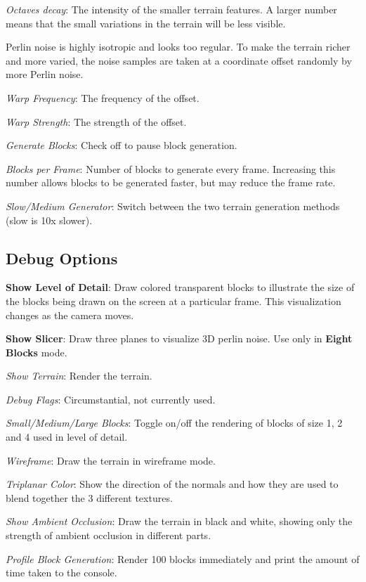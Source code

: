 \documentclass {article}
\begin{document}
\textit{Octaves decay}: The intensity of the smaller terrain features. A larger number means that the small variations in the terrain will be less visible.

Perlin noise is highly isotropic and looks too regular. To make the terrain richer and more varied, the noise samples are taken at a coordinate offset randomly by more Perlin noise.

\textit{Warp Frequency}: The frequency of the offset.

\textit{Warp Strength}: The strength of the offset.

\textit{Generate Blocks}: Check off to pause block generation.

\textit{Blocks per Frame}: Number of blocks to generate every frame. Increasing this number allows blocks to be generated faster, but may reduce the frame rate.

\textit{Slow/Medium Generator}: Switch between the two terrain generation methods (slow is 10x slower).

\subsection{Debug Options}

\textbf{Show Level of Detail}: Draw colored transparent blocks to illustrate the size of the blocks being drawn on the screen at a particular frame. This visualization changes as the camera moves.

\textbf{Show Slicer}: Draw three planes to visualize 3D perlin noise. Use only in \textbf{Eight Blocks} mode.

\textit{Show Terrain}: Render the terrain.

\textit{Debug Flags}: Circumstantial, not currently used.

\textit{Small/Medium/Large Blocks}: Toggle on/off the rendering of blocks of size 1, 2 and 4 used in level of detail.

\textit{Wireframe}: Draw the terrain in wireframe mode.

\textit{Triplanar Color}: Show the direction of the normals and how they are used to blend together the 3 different textures.

\textit{Show Ambient Occlusion}: Draw the terrain in black and white, showing only the strength of ambient occlusion in different parts.

\textit{Profile Block Generation}: Render 100 blocks immediately and print the amount of time taken to the console.
\end{document}
